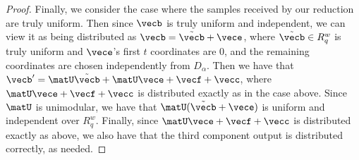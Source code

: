 \begin{proof}
Finally, we consider the case where the samples received by our
reduction are truly uniform. Then since $\vecb$ is truly uniform and
independent, we can view it as being distributed as
$\vecb=\tilde{\vecb}+\vece$, where $\tilde{\vecb} \in R_q^{w}$
is truly uniform and $\vece$'s first $t$ coordinates are $0$, and the
remaining coordinates are chosen independently from $D_{\alpha}$. Then
we have that $\vecb'=\matU\tilde{\vecb}+\matU\vece+\vecf+\vecc$, where
$\matU\vece+\vecf+\vecc$ is distributed exactly as in the case
above. Since $\matU$ is unimodular, we have that
$\matU(\tilde{\vecb}+\vece)$ is uniform and independent over
$R_q^{w}$. Finally, since $\matU\vece+\vecf+\vecc$ is distributed
exactly as above, we also have that the third component output is
distributed correctly, as needed.
\end{proof}